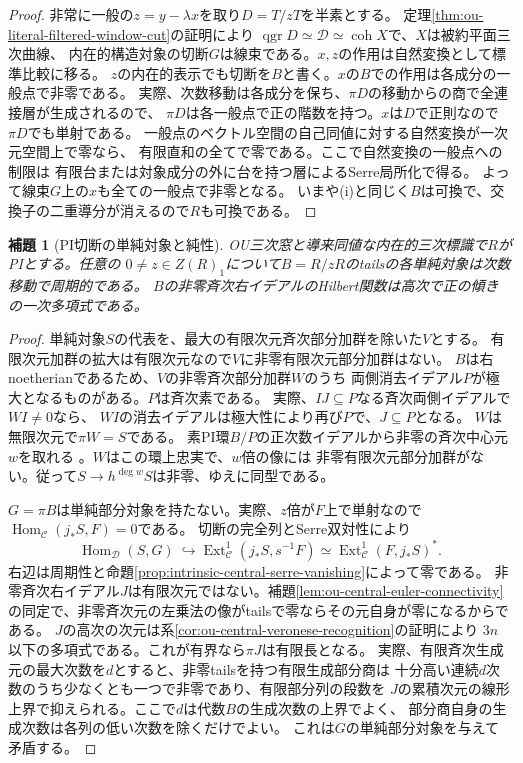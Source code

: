 \documentclass[11pt,a4paper]{ltjsarticle}
\newtheorem{lemma}[theorem]{補題}
\theoremstyle{definition}
\newcommand{\qgr}{\operatorname{qgr}}
\newcommand{\coh}{\operatorname{coh}}
\begin{document}
\begin{proof}
非常に一般の$z=y-\lambda x$を取り$D=T/zT$を半素とする。
定理\ref{thm:ou-literal-filtered-window-cut}の証明により
$\qgr D\simeq\mathcal D\simeq\coh X$で、$X$は被約平面三次曲線、
内在的構造対象の切断$G$は線束である。$x,z$の作用は自然変換として標準比較に移る。
$z$の内在的表示でも切断を$B$と書く。$x$の$B$での作用は各成分の一般点で非零である。
実際、次数移動は各成分を保ち、$\pi D$の移動からの商で全連接層が生成されるので、
$\pi D$は各一般点で正の階数を持つ。$x$は$D$で正則なので$\pi D$でも単射である。
一般点のベクトル空間の自己同値に対する自然変換が一次元空間上で零なら、
有限直和の全てで零である。ここで自然変換の一般点への制限は
有限台または対象成分の外に台を持つ層によるSerre局所化で得る。
よって線束$G$上の$x$も全ての一般点で非零となる。
いまや(i)と同じく$B$は可換で、交換子の二重導分が消えるので$R$も可換である。
\end{proof}

\begin{lemma}[PI切断の単純対象と純性]
\label{lem:ou-pi-cut-purity}
OU三次窓と導来同値な内在的三次標識で$R$がPIとする。任意の
$0\ne z\in Z(R)_1$について$B=R/zR$のtailsの各単純対象は次数移動で周期的である。
$B$の非零斉次右イデアルのHilbert関数は高次で正の傾きの一次多項式である。
\end{lemma}
\begin{proof}
単純対象$S$の代表を、最大の有限次元斉次部分加群を除いた$V$とする。
有限次元加群の拡大は有限次元なので$V$に非零有限次元部分加群はない。
$B$は右noetherianであるため、$V$の非零斉次部分加群$W$のうち
両側消去イデアル$P$が極大となるものがある。$P$は斉次素である。
実際、$I J\subseteq P$なる斉次両側イデアルで$WI\ne0$なら、
$WI$の消去イデアルは極大性により再び$P$で、$J\subseteq P$となる。
$W$は無限次元で$\pi W=S$である。
素PI環$B/P$の正次数イデアルから非零の斉次中心元$w$を取れる
\cite{Rowen1973Center}。$W$はこの環上忠実で、$w$倍の像には
非零有限次元部分加群がない。従って$S\to h^{\deg w}S$は非零、ゆえに同型である。

$G=\pi B$は単純部分対象を持たない。実際、$z$倍が$F$上で単射なので
$\operatorname{Hom}_{\mathcal C}(j_*S,F)=0$である。
切断の完全列とSerre双対性により
\[
 \operatorname{Hom}_{\mathcal D}(S,G)\ \hookrightarrow \operatorname{Ext}^1_{\mathcal C}(j_*S,s^{-1}F)
 \simeq\operatorname{Ext}^1_{\mathcal C}(F,j_*S)^* .
\]
右辺は周期性と命題\ref{prop:intrinsic-central-serre-vanishing}によって零である。
非零斉次右イデアル$J$は有限次元ではない。補題\ref{lem:ou-central-euler-connectivity}
の同定で、非零斉次元の左乗法の像がtailsで零ならその元自身が零になるからである。
$J$の高次の次元は系\ref{cor:ou-central-veronese-recognition}の証明により
$3n$以下の多項式である。これが有界なら$\pi J$は有限長となる。
実際、有限斉次生成元の最大次数を$d$とすると、非零tailsを持つ有限生成部分商は
十分高い連続$d$次数のうち少なくとも一つで非零であり、有限部分列の段数を
$J$の累積次元の線形上界で抑えられる。ここで$d$は代数$B$の生成次数の上界でよく、
部分商自身の生成次数は各列の低い次数を除くだけでよい。
これは$G$の単純部分対象を与えて矛盾する。
\end{proof}
\end{document}
